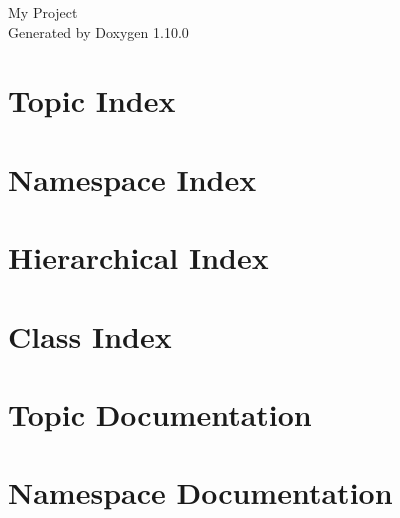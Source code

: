 \documentclass[twoside]{book}
\newcommand{\+}{\discretionary{\mbox{\scriptsize$\hookleftarrow$}}{}{}}
\newcommand{\clearemptydoublepage}{%
    \newpage{\pagestyle{empty}\cleardoublepage}%
  }
\begin{document}
  \raggedbottom
    \hypersetup{pageanchor=false,
                bookmarksnumbered=true,
                pdfencoding=unicode
               }
  \begin{titlepage}
  \vspace*{7cm}
  \begin{center}%
  {\Large My Project}\\
  \vspace*{1cm}
  {\large Generated by Doxygen 1.10.0}\\
  \end{center}
  \end{titlepage}
  \clearemptydoublepage
  \tableofcontents
  \clearemptydoublepage
  \hypersetup{pageanchor=true}
\chapter{Topic Index}

\chapter{Namespace Index}

\chapter{Hierarchical Index}

\chapter{Class Index}

\chapter{Topic Documentation}


\chapter{Namespace Documentation}




\end{document}
